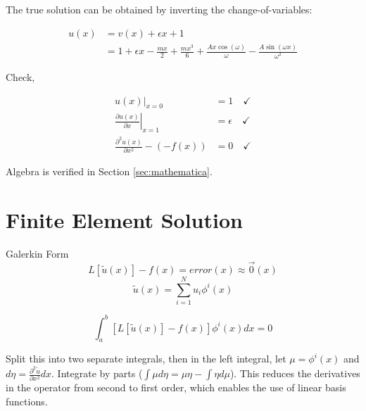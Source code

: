 \documentclass[10pt]{article}
\begin{document}
The true solution can be obtained by inverting the change-of-variables:
    
\begin{equation}
    \label{eqn:u(x)}
    \begin{split}
        u(x) &= v(x) + \epsilon x + 1 \\
        &= 1 + \epsilon x - \frac{m x}{2} + \frac{m x^3}{6} + \frac{A x \cos(\omega)}{\omega} -
        \frac{A \sin(\omega x)}{\omega^2}
    \end{split}
\end{equation}

Check, 

\begin{equation}
    \begin{split}
        \left. u(x) \right|_{x=0} &= 1 \quad \checkmark \\
        \left. \frac{\partial u(x)}{\partial x} \right|_{x=1} &= \epsilon \quad \checkmark \\
        \frac{\partial^2 u(x)}{\partial x^2} - (-f(x)) &= 0 \quad \checkmark
    \end{split}
\end{equation}

Algebra is verified in Section \ref{sec:mathematica}.

\section{Finite Element Solution}
\label{sec:FE_work}

Galerkin Form
\begin{equation}
    \label{eqn:galerkin}
    L[\tilde{u}(x)] - f(x) = error(x) \approx \vec{0}(x)
\end{equation}
\begin{equation}
    \label{eqn:sumofbases}
    \tilde{u}(x) = \sum_{i=1}^{N}u_i \phi^i(x)
\end{equation}


\begin{equation}
    \label{eqn:split-integral}
        \int_a^b{\left[ L[\tilde{u}(x)] - f(x) \right] \phi^i(x) dx } = 0
\end{equation}

Split this into two separate integrals, then in the left integral, let $\mu=\phi^i(x)$ and $d\eta=\frac{\partial^2\tilde{u}}{\partial x^2} dx$.
Integrate by parts ($\int \mu d\eta = \mu \eta - \int \eta d\mu$). This reduces the derivatives in the operator from second to first order, which enables the use of linear basis functions.
\end{document}
